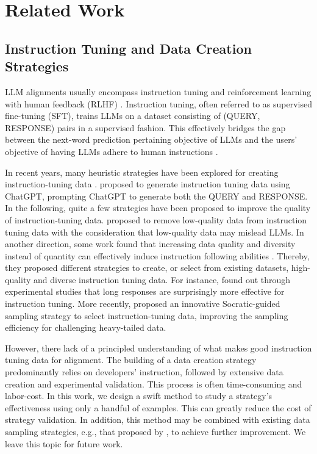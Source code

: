 \section{Related Work}
\subsection{Instruction Tuning and Data Creation Strategies}

LLM alignments usually encompass instruction tuning and reinforcement learning with human feedback (RLHF) \cite{ouyang2022training}. Instruction tuning, often referred to as supervised fine-tuning (SFT),  trains LLMs on a dataset consisting of (QUERY, RESPONSE) pairs in a supervised fashion. This effectively bridges the gap between the next-word prediction pertaining objective of LLMs and
the users’ objective of having LLMs adhere to human instructions \cite{zhang2023instruction}.

In recent years, many heuristic strategies have been explored for creating instruction-tuning data \cite{sprague2024cot}. \citet{wang2023self} proposed to generate instruction tuning data using ChatGPT, prompting ChatGPT to generate both the QUERY and RESPONSE. In the following, quite a few strategies have been proposed to improve the quality of instruction-tuning data. \citet{wang2023noise,weber2024donkii} proposed to remove low-quality data from instruction tuning data with the consideration that low-quality data may mislead LLMs. In another direction, some work found that increasing data quality and diversity instead of quantity can effectively induce instruction following abilities \cite{zhou2024lima,liumakes,xialess}. Thereby, they proposed different strategies to create, or select from existing datasets, high-quality and diverse instruction tuning data. 
For instance, \citet{shen2024rethinking} found out through experimental studies that long responses are surprisingly more effective for instruction tuning. 
More recently, \citet{ding2024mitigating} proposed an innovative Socratic-guided sampling strategy to select instruction-tuning data, improving the sampling efficiency for challenging heavy-tailed data.

However, there lack of a principled understanding of what makes good instruction tuning data for alignment. The building of a data creation strategy predominantly relies on developers' instruction, followed by extensive data creation and experimental validation.
This process is often time-consuming and labor-cost. In this work, we design a swift method to study a strategy's effectiveness using only a handful of examples. This can greatly reduce the cost of strategy validation. In addition, this method may be combined with existing data sampling strategies, e.g., that proposed by \citet{ding2024mitigating}, to achieve further improvement. We leave this topic for future work.

